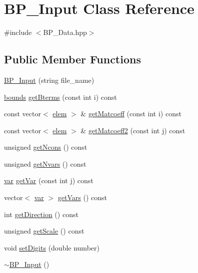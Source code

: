 \hypertarget{class_b_p___input}{\section{B\-P\-\_\-\-Input Class Reference}
\label{class_b_p___input}
}


{\ttfamily \#include $<$B\-P\-\_\-\-Data.\-hpp$>$}

\subsection*{Public Member Functions}
\begin{DoxyCompactItemize}
\item 
\hyperlink{class_b_p___input_af11c6d9710bee39d23a4abba20cb630f}{B\-P\-\_\-\-Input} (string file\-\_\-name)
\item 
\hyperlink{structbounds}{bounds} \hyperlink{class_b_p___input_af4d2583195fd4629455d74923ca499fe}{get\-Bterms} (const int i) const 
\item 
const vector$<$ \hyperlink{structelem}{elem} $>$ \& \hyperlink{class_b_p___input_adef364bb6eca83f1deab8c450bd64352}{get\-Matcoeff} (const int i) const 
\item 
const vector$<$ \hyperlink{structelem}{elem} $>$ \& \hyperlink{class_b_p___input_ac9ac75a8da307b1a4f4c5d19fa8fd456}{get\-Matcoeff2} (const int j) const 
\item 
unsigned \hyperlink{class_b_p___input_a945d4a08729b49412a9a94e7df780ab0}{get\-Ncons} () const 
\item 
unsigned \hyperlink{class_b_p___input_a6d6f9c288b6349bbbbbda2bacf367985}{get\-Nvars} () const 
\item 
\hyperlink{structvar}{var} \hyperlink{class_b_p___input_a0e7dbca96bff6f3e143485584deec724}{get\-Var} (const int j) const 
\item 
vector$<$ \hyperlink{structvar}{var} $>$ \hyperlink{class_b_p___input_a05c2c750e02a0a2fd9de1ae0aa7a14c0}{get\-Vars} () const 
\item 
int \hyperlink{class_b_p___input_a82efaa6879d5c37d50fe82d71628c03f}{get\-Direction} () const 
\item 
unsigned \hyperlink{class_b_p___input_ac760da883346d05855da604a0f418e68}{get\-Scale} () const 
\item 
void \hyperlink{class_b_p___input_a6858da37c5b259b8b7d5c59fbd65acb3}{set\-Digits} (double number)
\item 
\hyperlink{class_b_p___input_a3341717cf5481b2369b600901ab5450d}{$\sim$\-B\-P\-\_\-\-Input} ()
\end{DoxyCompactItemize}
